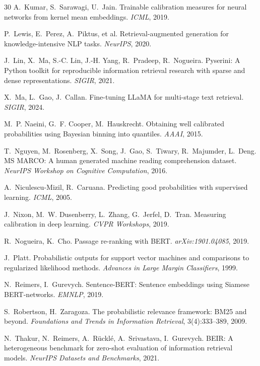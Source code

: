\begin{thebibliography}{30}
 A.~Kumar, S.~Sarawagi, U.~Jain.
Trainable calibration measures for neural networks from kernel mean embeddings.
\emph{ICML}, 2019.

 P.~Lewis, E.~Perez, A.~Piktus, et al.
Retrieval-augmented generation for knowledge-intensive NLP tasks.
\emph{NeurIPS}, 2020.

 J.~Lin, X.~Ma, S.-C. Lin, J.-H. Yang, R.~Pradeep,
R.~Nogueira.
Pyserini: A Python toolkit for reproducible information retrieval research with
sparse and dense representations.
\emph{SIGIR}, 2021.

 X.~Ma, L.~Gao, J.~Callan.
Fine-tuning LLaMA for multi-stage text retrieval.
\emph{SIGIR}, 2024.

 M.~P. Naeini, G.~F. Cooper, M.~Hauskrecht.
Obtaining well calibrated probabilities using Bayesian binning into quantiles.
\emph{AAAI}, 2015.

 T.~Nguyen, M.~Rosenberg, X.~Song, J.~Gao,
S.~Tiwary, R.~Majumder, L.~Deng.
MS MARCO: A human generated machine reading comprehension dataset.
\emph{NeurIPS Workshop on Cognitive Computation}, 2016.

 A.~Niculescu-Mizil, R.~Caruana.
Predicting good probabilities with supervised learning.
\emph{ICML}, 2005.

 J.~Nixon, M.~W. Dusenberry, L.~Zhang, G.~Jerfel,
D.~Tran.
Measuring calibration in deep learning.
\emph{CVPR Workshops}, 2019.

 R.~Nogueira, K.~Cho.
Passage re-ranking with BERT.
\emph{arXiv:1901.04085}, 2019.

 J.~Platt.
Probabilistic outputs for support vector machines and comparisons to regularized
likelihood methods.
\emph{Advances in Large Margin Classifiers}, 1999.

 N.~Reimers, I.~Gurevych.
Sentence-BERT: Sentence embeddings using Siamese BERT-networks.
\emph{EMNLP}, 2019.

 S.~Robertson, H.~Zaragoza.
The probabilistic relevance framework: BM25 and beyond.
\emph{Foundations and Trends in Information Retrieval}, 3(4):333--389, 2009.

 N.~Thakur, N.~Reimers, A.~R\"uckl\'e, A.~Srivastava,
I.~Gurevych.
BEIR: A heterogeneous benchmark for zero-shot evaluation of information retrieval
models.
\emph{NeurIPS Datasets and Benchmarks}, 2021.


\end{thebibliography}
